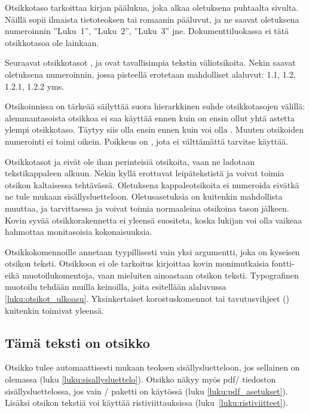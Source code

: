 Otsikkotaso  tarkoittaa kirjan päälukua, joka alkaa
oletuksena puhtaalta sivulta. Näillä sopii ilmaista tietoteoksen tai
romaanin pääluvut, ja ne saavat oletuksena numeroinnin ''Luku~1'',
''Luku~2'', ''Luku~3'' jne. Dokumenttiluokassa  ei tätä
otsikkotasoa ole lainkaan.

Seuraavat otsikkotasot ,  ja
 ovat tavallisimpia tekstin väliotsikoita. Nekin
saavat oletuksena numeroinnin, jossa pisteellä erotetaan mahdolliset
alaluvut: 1.1, 1.2, 1.2.1, 1.2.2 yms.

Otsikoinnissa on tärkeää säilyttää suora hierarkkinen suhde
otsikkotasojen välillä: alemmantasoista otsikkoa ei saa käyttää ennen
kuin on ensin ollut yhtä astetta ylempi otsikkotaso. Täytyy siis olla
ensin  ennen kuin voi olla . Muuten
otsikoiden numerointi ei toimi oikein. Poikkeus on , jota
ei välttämättä tarvitse käyttää.

Otsikkotasot  ja  eivät ole
ihan perinteisiä otsikoita, vaan ne ladotaan tekstikappaleen alkuun.
Nekin kyllä erottuvat leipätekstistä ja voivat toimia otsikon
kaltaisessa tehtävässä. Oletuksena kappaleotsikoita ei numeroida eivätkä
ne tule mukaan sisällysluetteloon. Oletusasetuksia on kuitenkin
mahdollista muuttaa, ja tarvittaessa  ja
 voivat toimia normaaleina otsikoina tason
 jälkeen. Kovin syvää otsikkorakennetta ei
yleensä suositeta, koska lukijan voi olla vaikeaa hahmottaa monitasoisia
kokonaisuuksia.

Otsikkokomennoille annetaan tyypillisesti vain yksi argumentti, joka on
kyseisen otsikon teksti. Otsikkoon ei ole tarkoitus kirjoittaa kovin
monimutkaisia fontti- eikä muotoilukomentoja, vaan mieluiten ainoastaan
otsikon teksti. Typografinen muotoilu tehdään muilla keinoilla, joita
esitellään alaluvussa \ref{luku:otsikot_ulkoasu}. Yksinkertaiset
korostuskomennot tai tavutusvihjeet (\komento{-}) kuitenkin toimivat
yleensä.

\begin{koodilohkosis}
\section{Tämä teksti on otsikko}
\end{koodilohkosis}

Otsikko tulee automaattisesti mukaan teoksen sisällysluetteloon, jos
sellainen on olemassa (luku \ref{luku:sisallysluettelo}). Otsikko näkyy
myös pdf\-/ tiedoston sisällysluettelossa, jos vain
\-/ paketti on käytössä (luku
\ref{luku:pdf_asetukset}). Lisäksi otsikon tekstiä voi käyttää
ristiviittauksissa (luku~\ref{luku:ristiviitteet}).

